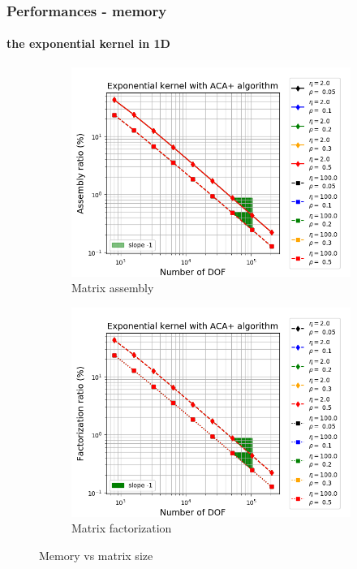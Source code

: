 \begin{frame}
\frametitle{Performances - memory}
\framesubtitle{the exponential kernel in 1D}
\begin{figure}
    \centering
    \begin{subfigure}[b]{0.45\textwidth}
        \includegraphics[scale=0.3]{./img/line_EXP_assembly_ratio}
        \caption{Matrix assembly}
    \end{subfigure}
    \begin{subfigure}[b]{0.45\textwidth}
        \includegraphics[scale=0.3]{./img/line_EXP_factorization_ratio}
        \caption{Matrix factorization}
    \end{subfigure}
    \caption{Memory vs matrix size}
\end{figure}
\end{frame}
